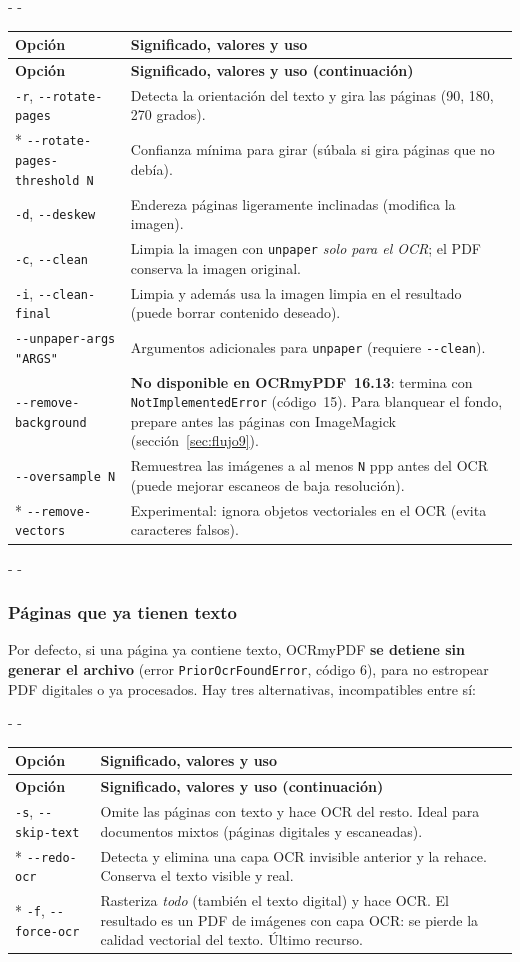 \documentclass[11pt,a4paper]{article}
\makeatletter
\newcommand{\necesitaespacio}[1]{\par\penalty-100\begingroup
	\setlength{\dimen@}{#1}\dimen@ii\pagegoal\advance\dimen@ii-\pagetotal
	\ifdim\dimen@>\dimen@ii\ifdim\dimen@ii>\z@\vfil\fi\penalty-\@M\fi\endgroup}
\newenvironment{opciones}[1][Opción]{%
	\par\begingroup\small
	\begin{longtable}{L{4.25cm}L{11.2cm}}
		\toprule\rowcolor{tablacab}\cab{#1} & \cab{Significado, valores y uso} \\ \midrule
		\endfirsthead
		\toprule\rowcolor{tablacab}\cab{#1} & \cab{Significado, valores y uso (continuación)} \\ \midrule
		\endhead
		\bottomrule
		\endfoot}
	{\end{longtable}\endgroup}
\newcommand{\cmd}[1]{\texttt{\textcolor{colcmd}{#1}}}      %
\newcommand{\opt}[1]{\texttt{\textcolor{colopt}{#1}}}      %
\newcommand{\val}[1]{\texttt{#1}}                          %
\newcommand{\cab}[1]{\textbf{#1}}
\makeatother
\begin{document}
	\necesitaespacio{25\baselineskip}
	\begin{opciones}
		\opt{-r}, \opt{-{}-rotate-pages} & Detecta la orientación del texto y gira las páginas (90, 180, 270 grados).\\*
		\opt{-{}-rotate-\allowbreak{}pages-\allowbreak{}threshold N} & Confianza mínima para girar (súbala si gira páginas que no debía).\\
		\opt{-d}, \opt{-{}-deskew} & Endereza páginas ligeramente inclinadas (modifica la imagen).\\
		\opt{-c}, \opt{-{}-clean} & Limpia la imagen con \cmd{unpaper} \emph{solo para el OCR}; el PDF conserva la imagen original.\\
		\opt{-i}, \opt{-{}-clean-final} & Limpia y además usa la imagen limpia en el resultado (puede borrar contenido deseado).\\
		\opt{-{}-unpaper-\allowbreak{}args "ARGS"} & Argumentos adicionales para \cmd{unpaper} (requiere \opt{-{}-clean}).\\
		\opt{-{}-remove-\allowbreak{}background} & \textbf{No disponible en OCRmyPDF~16.13}: termina con \texttt{NotImplementedError} (código~15). Para blanquear el fondo, prepare antes las páginas con ImageMagick (sección~\ref{sec:flujo9}).\\
		\opt{-{}-oversample N} & Remuestrea las imágenes a al menos \val{N} ppp antes del OCR (puede mejorar escaneos de baja resolución).\\*
		\opt{-{}-remove-\allowbreak{}vectors} & Experimental: ignora objetos vectoriales en el OCR (evita caracteres falsos).\\
	\end{opciones}
	
	\necesitaespacio{17\baselineskip}
	\subsubsection{Páginas que ya tienen texto}
	
	Por defecto, si una página ya contiene texto, OCRmyPDF \textbf{se detiene sin generar el archivo} (error \texttt{PriorOcrFoundError}, código 6), para no estropear PDF digitales o ya procesados. Hay tres alternativas, incompatibles entre sí:
	
	\necesitaespacio{13\baselineskip}
	\begin{opciones}
		\opt{-s}, \opt{-{}-skip-text} & Omite las páginas con texto y hace OCR del resto. Ideal para documentos mixtos (páginas digitales y escaneadas).\\*
		\opt{-{}-redo-ocr} & Detecta y elimina una capa OCR invisible anterior y la rehace. Conserva el texto visible y real.\\*
		\opt{-f}, \opt{-{}-force-ocr} & Rasteriza \emph{todo} (también el texto digital) y hace OCR. El resultado es un PDF de imágenes con capa OCR: se pierde la calidad vectorial del texto. Último recurso.\\
	\end{opciones}
	
\end{document}
